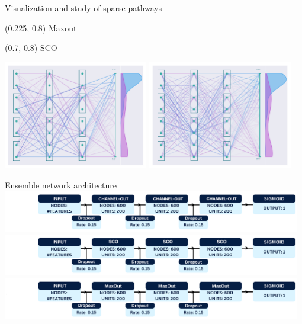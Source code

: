 \documentclass[UKenglish]{beamer}
\begin{document}
\begin{frame}{Visualization and study of sparse pathways}
    \begin{textblock}{0.8}(0.225, 0.8)
        {Maxout}
    \end{textblock}
    \begin{textblock}{0.8}(0.7, 0.8)
        {SCO}
    \end{textblock}
    \vfill
    \begin{center}
        \includegraphics[width = 0.475\textwidth]{figures/NetworkVis/AfterTraining.pdf}
        \includegraphics[width = 0.475\textwidth]{figures/NetworkVis/SCO/AfterTraining.pdf}
    \end{center}
\end{frame}
\begin{frame}{Ensemble network architecture}
    \includegraphics[width = 0.98\textwidth]{figures/channelout.png}
    \vfill
    \includegraphics[width = 0.98\textwidth]{figures/SCO.png}
    \vfill
    \includegraphics[width = 0.98\textwidth]{figures/maxout.png}
\end{frame}
\end{document}
